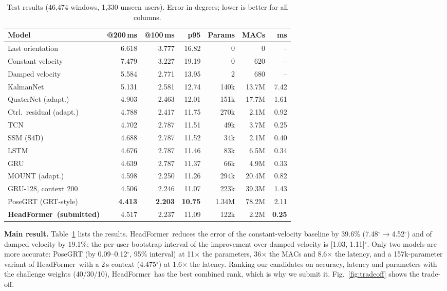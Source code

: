 \documentclass[conference]{IEEEtran}
\newcommand{\ours}{HeadFormer}   %
\begin{document}
\begin{table}[t]
\caption{Test results (46{,}474 windows, 1{,}330 unseen users). Error in degrees; lower is better for all columns.}
\label{tab:main}
\centering\scriptsize
\setlength{\tabcolsep}{3pt}
\begin{tabular}{lrrrrrr}
\toprule
Model & @200\,ms & @100\,ms & p95 & Params & MACs & ms \\
\midrule
Last orientation      & 6.618 & 3.777 & 16.82 & 0 & 0 & -- \\
Constant velocity     & 7.479 & 3.227 & 19.19 & 0 & 620 & -- \\
Damped velocity       & 5.584 & 2.771 & 13.95 & 2 & 680 & -- \\
\midrule
KalmanNet             & 5.131 & 2.581 & 12.74 & 140k & 13.7M & 7.42 \\
QuaterNet (adapt.)    & 4.903 & 2.463 & 12.01 & 151k & 17.7M & 1.61 \\
Ctrl.\ residual (adapt.) & 4.788 & 2.417 & 11.75 & 270k & 2.1M & 0.92 \\
TCN                   & 4.702 & 2.787 & 11.51 & 49k & 3.7M & 0.25 \\
SSM (S4D)             & 4.688 & 2.787 & 11.52 & 34k & 2.1M & 0.40 \\
LSTM                  & 4.676 & 2.787 & 11.46 & 83k & 6.5M & 0.34 \\
GRU                   & 4.639 & 2.787 & 11.37 & 66k & 4.9M & 0.33 \\
MOUNT (adapt.)        & 4.598 & 2.250 & 11.26 & 294k & 20.4M & 0.82 \\
GRU-128, context 200  & 4.506 & 2.246 & 11.07 & 223k & 39.3M & 1.43 \\
PoseGRT (GRT-style)   & \textbf{4.413} & \textbf{2.203} & \textbf{10.75} & 1.34M & 78.2M & 2.11 \\
\midrule
\textbf{\ours\ (submitted)} & 4.517 & 2.237 & 11.09 & 122k & 2.2M & \textbf{0.25} \\
\bottomrule
\end{tabular}
\end{table}

\textbf{Main result.} Table~\ref{tab:main} lists the results. \ours\ reduces the error of the constant-velocity baseline by
39.6\% (7.48$^\circ\!\to$4.52$^\circ$) and of damped velocity by 19.1\%; the per-user bootstrap interval of the improvement
over damped velocity is [1.03, 1.11]$^\circ$. Only two models are more accurate: PoseGRT (by 0.09--0.12$^\circ$, 95\%
interval) at 11$\times$ the parameters, 36$\times$ the MACs and 8.6$\times$ the latency, and a 157k-parameter variant of
\ours\ with a 2\,s context (4.475$^\circ$) at 1.6$\times$ the latency. Ranking our candidates on accuracy, latency and
parameters with the challenge weights (40/30/10), \ours\ has the best combined rank, which is why we submit it.
Fig.~\ref{fig:tradeoff} shows the trade-off.
\end{document}
